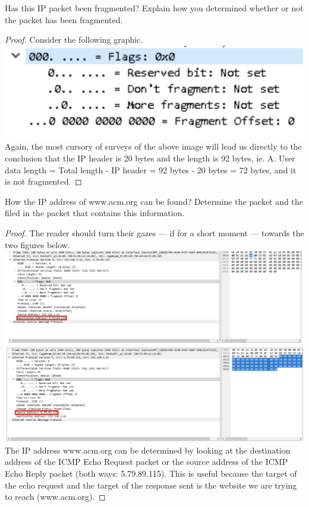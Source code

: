 \documentclass[../main.tex]{subfiles}
\begin{document}
\begin{wts}
    Has this IP packet been fragmented? Explain how you determined whether or not the packet has been fragmented.
\end{wts}
\begin{proof}
    Consider the following graphic.\\
    \includegraphics[width=\textwidth]{subfiles/images/PART1_Q7.png}
    Again, the most cursory of surveys of the above image will lead us directly to the conclusion that the IP header is 20 bytes and the length is 92 bytes, ie. A. User data length = Total length - IP header = 92 bytes - 20 bytes = 72 bytes, and it is not fragmented.
\end{proof}
\newpage

\begin{wts}
    How the IP address of www.acm.org can be found? Determine the packet and the filed in the packet that contains this information.
\end{wts}
\begin{proof}
    The reader should turn their gazes — if for a short moment — towards the two figures below.\\
    \includegraphics[width=\textwidth]{subfiles/images/PART1_Q8_1.png}
    \includegraphics[width=\textwidth]{subfiles/images/PART1_Q8_2.png}
    The IP address www.acm.org can be determined by looking at the destination address of the ICMP Echo Request packet or the source address of the ICMP Echo Reply packet (both ways: 5.79.89.115). This is useful because the target of the echo request and the target of the response sent is the website we are trying to reach (www.acm.org).
\end{proof}
\newpage
\end{document}
